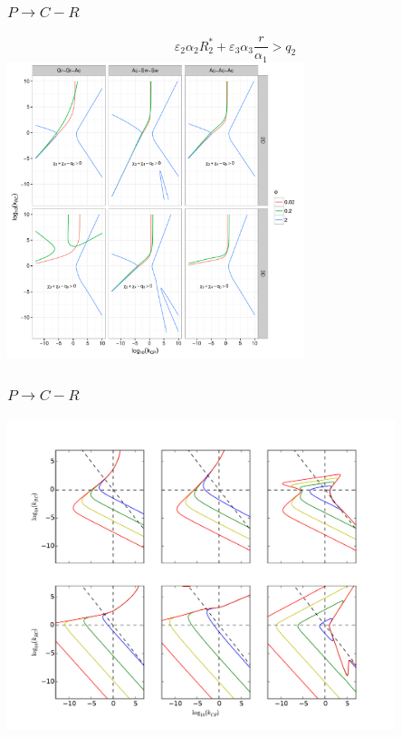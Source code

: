 \documentclass[11 pt,t]{beamer}
\begin{document}
\begin{frame}
  \frametitle{$P \to C-R$}
  \tiny
  \begin{equation}
    \varepsilon_2 \alpha_2 R_2^* + \varepsilon_3 \alpha_3 \frac{r}{\alpha_1} > q_2
  \end{equation}
  \centering
  \includegraphics[width = 0.65\textwidth]{../manuscript/Plots/NecPCR.pdf}
\end{frame}

\begin{frame}
  \frametitle{$P \to C-R$}
  \centering
  \includegraphics[width = 0.85\textwidth]{../manuscript/Plots/Z(IC4)AcGrGr.pdf}
\end{frame}
\end{document}
